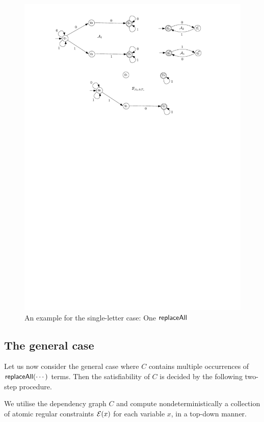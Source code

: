 \begin{example}
\begin{figure}[htbp]
\begin{center}
\includegraphics[scale=0.65]{single-letter-example.pdf}
\end{center}
\caption{An example for the single-letter case: One $\mathsf{replaceAll}$}\label{fig-sl-exmp}
\end{figure}
\end{example}


\subsection{The general case}

Let us now consider the general case where $C$ contains multiple occurrences of $\mathsf{replaceAll}(\cdots)$ terms.
Then the satisfiability of $C$ is decided by the following two-step procedure.

\smallskip

 We utilise the dependency graph $C$ and compute nondeterministically a collection of atomic regular constraints $\mathcal{E}(x)$ for each variable $x$, in a top-down manner.


